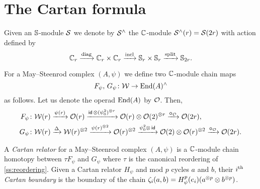 
\section{The Cartan formula}\label{s:cartan}

Given an $\mathbb{S}$-module $\mathcal{S}$ we denote by $\mathcal{S}^\wedge$ the $\mathbb{C}$-module $\mathcal{S}^\wedge(r) = \mathcal{S}(2r)$ with
action defined by
\begin{equation}\label{eq:cyclic to 2-symetric}
	\mathbb{C}_r \xrightarrow{\mathrm{diag}}
	\mathbb{C}_r \times \mathbb{C}_r \xrightarrow{\mathrm{incl}}
	\mathbb{S}_r \times \mathbb{S}_r \xrightarrow{\mathrm{split}}
	\mathbb{S}_{2r}.
\end{equation}

For a May--Steenrod complex $(A,\psi)$ we define two $\mathbb{C}$-module chain maps
\[
F_\psi,\, G_\psi \colon \mathcal{W} \to \mathrm{End}(A)^\wedge
\]
as follows.
Let us denote the operad $\mathrm{End}(A)$ by $\mathcal{O}$.
Then,
\begin{align*}
	F_\psi \colon& \mathcal{W}(r) \xrightarrow{\psi(r)} \mathcal{O}(r) \xrightarrow{\mathsf{id}\, \otimes (\psi_0^2)^{\otimes r}}
	\mathcal{O}(r) \otimes \mathcal{O}(2)^{\otimes r} \xrightarrow{\bm{\circ}_{\mathcal{O}}}
	\mathcal{O}(2r), \\
	G_\psi \colon& \mathcal{W}(r) \xrightarrow{\Delta}
	\mathcal{W}(r)^{\otimes 2} \xrightarrow{\psi(r)^{\otimes 2}}
	\mathcal{O}(r)^{\otimes 2} \xrightarrow{\psi_0^2 \otimes\, \mathsf{id}}
	\mathcal{O}(2) \otimes \mathcal{O}(r)^{\otimes 2} \xrightarrow{\bm{\circ}_{\mathcal{O}}}
	\mathcal{O}(2r).
\end{align*}

\begin{definition*}
	A \textit{Cartan relator} for a May--Steenrod complex $(A, \psi)$ is a $\mathbb{C}$-module chain homotopy between $\tau F_\psi$ and $G_\psi$ where $\tau$ is the canonical reordering of \cref{ss:reordering}.
	Given a Cartan relator $H_\psi$ and mod $p$ cycles $a$ and $b$, their \textit{$i^{\mathrm{th}}$ Cartan boundary} is the boundary of the chain $\zeta_i(a,b) = H_\psi^p(e_i)(a^{\otimes p} \otimes b^{\otimes p})$.
\end{definition*}

